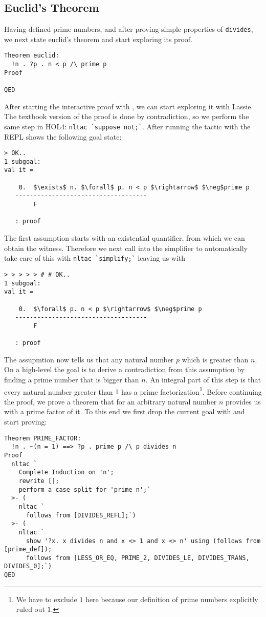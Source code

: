 \subsection{Euclid's Theorem}
Having defined prime numbers, and after proving simple properties of
\lstinline{divides}, we next state euclid's theorem and start
exploring its proof.

\begin{lstlisting}
Theorem euclid:
  !n . ?p . n < p /\ prime p
Proof

QED
\end{lstlisting}

After starting the interactive proof with , we can start exploring
it with Lassie.
The textbook version of the proof is done by contradiction, so we perform the
same step in HOL4: \lstinline{nltac `suppose not;`}.
After running the tactic with  the REPL shows the following goal state:
\begin{lstlisting}[frame=single, mathescape=true]
> OK..
1 subgoal:
val it =

    0.  $\exists$ n. $\forall$ p. n < p $\rightarrow$ $\neg$prime p
   ------------------------------------
        F

   : proof
\end{lstlisting}
The first assumption starts with an existential quantifier, from which we can
obtain the witness. Therefore we next call into the simplifier to automatically
take care of this with \lstinline{nltac `simplify;`} leaving us with
\begin{lstlisting}[frame=single, mathescape=true]
> > > > > # # OK..
1 subgoal:
val it =

    0.  $\forall$ p. n < p $\rightarrow$ $\neg$prime p
   ------------------------------------
        F

   : proof
\end{lstlisting}

The assupmtion now tells us that any natural number $p$ which is greater than
$n$.
On a high-level the goal is to derive a contradiction from this assumption by
finding a prime number that is bigger than $n$.
An integral part of this step is that every natural number greater than $1$ has
a prime factorization\footnote{We have to exclude $1$ here because our definition of prime numbers explicitly ruled out $1$.}.
Before continuing the proof, we prove a theorem that for an arbitrary natural
number $n$ provides us with a prime factor of it.
To this end we first drop the current goal with  and start proving:
\begin{lstlisting}
Theorem PRIME_FACTOR:
  !n . ~(n = 1) ==> ?p . prime p /\ p divides n
Proof
  nltac `
    Complete Induction on 'n';
    rewrite [];
    perform a case split for 'prime n';`
  >- (
    nltac `
      follows from [DIVIDES_REFL];`)
  >- (
    nltac `
      show '?x. x divides n and x <> 1 and x <> n' using (follows from [prime_def]);
      follows from [LESS_OR_EQ, PRIME_2, DIVIDES_LE, DIVIDES_TRANS, DIVIDES_0];`)
QED
\end{lstlisting}

